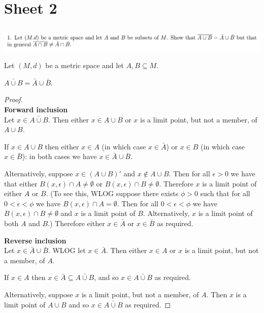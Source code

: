 \documentclass[12pt]{article}
\begin{document}
\section{Sheet 2}


\subsection{}
\begin{mdframed}
\includegraphics[width=400pt]{img/oxford-a2-2-1.png}
\end{mdframed}

Let $(M, d)$ be a metric space and let $A, B \subseteq M$.


\begin{claim*}
  $\bar{A \cup B} = \bar A \cup \bar B$.
\end{claim*}
\begin{proof}~\\
  {\bf Forward inclusion}\\
  Let $x \in \bar{A \cup B}$. Then either $x \in A \cup B$ or $x$ is a limit point, but not a
  member, of $A \cup B$.

  If $x \in A \cup B$ then either $x \in A$ (in which case $x \in \bar A$) or $x \in B$ (in which
  case $x \in \bar B$): in both cases we have $x \in \bar A \cup \bar B$.

  Alternatively, suppose $x \in (A \cup B)'$ and $x \notin A \cup B$. Then for all $\epsilon > 0$
  we have that either $B(x, \epsilon) \cap A \neq \emptyset$ or
  $B(x, \epsilon) \cap B \neq \emptyset$. Therefore $x$ is a limit point of either $A$ or $B$. (To
  see this, WLOG suppose there exists $\phi > 0$ such that for all $0 < \epsilon < \phi$ we have
  $B(x, \epsilon) \cap A = \emptyset$. Then for all $0 < \epsilon < \phi$ we have
  $B(x, \epsilon) \cap B \neq \emptyset$ and $x$ is a limit point of $B$. Alternatively, $x$ is a
  limit point of both $A$ and $B$.) Therefore either $x \in \bar A$ or $x \in \bar B$ as required.

  {\bf Reverse inclusion}\\
  Let $x \in \bar A \cup \bar B$. WLOG let $x \in \bar A$. Then either $x \in A$ or $x$ is a limit
  point, but not a member, of $A$.

  If $x \in A$ then $x \in \bar A \subseteq \bar{A \cup B}$, and so $x \in \bar{A \cup B}$ as
  required.

  Alternatively, suppose $x$ is a limit point, but not a member, of $A$. Then $x$ is a limit point
  of $A \cup B$ and so $x \in \bar{A \cup B}$ as required.
\end{proof}
\end{document}
